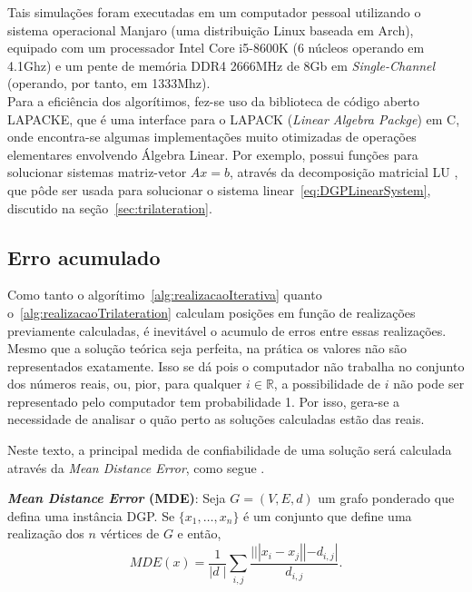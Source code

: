 \documentclass[a4paper,12pt]{article}
\begin{document}
	Tais simulações foram executadas em um computador pessoal utilizando o sistema operacional Manjaro (uma distribuição Linux baseada em Arch), equipado com um processador Intel Core i5-8600K (6 núcleos operando em 4.1Ghz) e um pente de memória DDR4 2666MHz de 8Gb em \textit{Single-Channel} (operando, por tanto, em 1333Mhz).	
	\\
	
	Para a eficiência dos algorítimos, fez-se uso da biblioteca de código aberto LAPACKE, que é uma interface para o LAPACK (\textit{Linear Algebra Packge}) em C, onde encontra-se algumas implementações muito otimizadas de operações elementares envolvendo Álgebra Linear. Por exemplo, possui funções para solucionar sistemas matriz-vetor $Ax = b$, através da decomposição matricial LU \cite{AlgebraLinearElon}, que pôde ser usada para solucionar o sistema linear~\ref{eq:DGPLinearSystem}, discutido na seção~\ref{sec:trilateration}.
	
	\subsection{Erro acumulado}
	
	Como tanto o algorítimo~\ref{alg:realizacaoIterativa} quanto o~\ref{alg:realizacaoTrilateration} calculam posições em função de realizações previamente calculadas, é inevitável o acumulo de erros entre essas realizações. Mesmo que a solução teórica seja perfeita, na prática os valores não são representados exatamente. Isso se dá pois o computador não trabalha no conjunto dos números reais, ou, pior, para qualquer $i \in\mathbb{R}$, a possibilidade de $i$ não pode ser representado pelo computador tem probabilidade 1. Por isso, gera-se a necessidade de analisar o quão perto as soluções calculadas estão das reais.
	
	Neste texto, a principal medida de confiabilidade de uma solução será calculada através da \textit{Mean Distance Error}, como segue \cite{mucherino:BP}.
	
	\begin{center}
		\begin{minipage}{0.9 \linewidth}
			\textbf{\textit{Mean Distance Error} (MDE)}: Seja $G= (V,E,d)$ um grafo ponderado que defina uma instância DGP. Se $\{x_1, \dots, x_n\}$ é um conjunto que define uma realização dos $n$ vértices de $G$ e então,
			$$MDE(x) = \frac{1}{|d\;|} \sum_{i,j}^{}\frac{|||x_i - x_j|| - d_{i,j}|}{d_{i,j}} .$$
		\end{minipage}
	\end{center}
	
\end{document}
